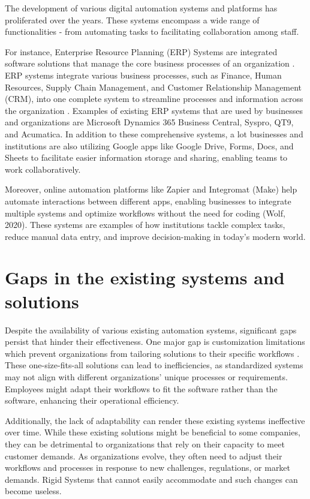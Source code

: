 The development of various digital automation systems and platforms has proliferated over the years. These systems encompass a wide range of functionalities - from automating tasks to facilitating collaboration among staff.

For instance, Enterprise Resource Planning (ERP) Systems are integrated software solutions that manage the core business processes of an organization \cite{blahusiakova2023}. ERP systems integrate various business processes, such as Finance, Human Resources, Supply Chain Management, and Customer Relationship Management (CRM), into one complete system to streamline processes and information across the organization \cite{kimberling2024}. Examples of existing ERP systems that are used by businesses and organizations are Microsoft Dynamics 365 Business Central, Syspro, QT9, and Acumatica. In addition to these comprehensive systems, a lot businesses and institutions are also utilizing Google apps like Google Drive, Forms, Docs, and Sheets to facilitate easier information storage and sharing, enabling teams to work collaboratively. 
 
Moreover, online automation platforms like Zapier and Integromat (Make) help automate interactions between different apps, enabling businesses to integrate multiple systems and optimize workflows without the need for coding (Wolf, 2020). These systems are examples of how institutions tackle complex tasks, reduce manual data entry, and improve decision-making in today's modern world.

\section{Gaps in the  existing systems and solutions}

Despite the availability of various existing automation systems, significant gaps persist that hinder their effectiveness. One major gap is customization limitations which prevent organizations from tailoring solutions to their specific workflows \cite{aleixo2010}. These one-size-fits-all solutions can lead to inefficiencies, as standardized systems may not align with different organizations' unique processes or requirements. Employees might adapt their workflows to fit the software rather than the software, enhancing their operational efficiency. 

Additionally, the lack of adaptability can render these existing systems ineffective over time. While these existing solutions might be beneficial to some companies, they can be detrimental to organizations that rely on their capacity to meet customer demands\cite{akkermans2003}. As organizations evolve, they often need to adjust their workflows and processes in response to new challenges, regulations, or market demands. Rigid Systems that cannot easily accommodate and such changes can become useless.

